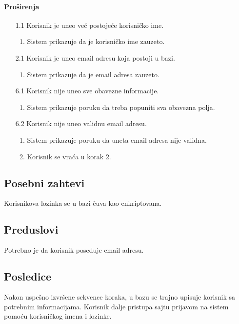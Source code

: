 \documentclass[a4paper,12pt]{report}
\begin{document}
    \paragraph*{Proširenja} 
    \begin{enumerate}
        \item[1.1] Korisnik je uneo već postojeće korisničko ime.
            \begin{enumerate}[noitemsep,topsep=-8pt]
                \item Sistem prikazuje da je korisničko ime zauzeto.
            \end{enumerate}
   
        \item[2.1] Korisnik je uneo email adresu koja postoji u bazi.
        \begin{enumerate}[noitemsep,topsep=-8pt]
            \item Sistem prikazuje da je email adresa zauzeto.
        \end{enumerate}
    
        \item[6.1] Korisnik nije uneo sve obavezne informacije.
            \begin{enumerate}[noitemsep,topsep=-8pt]
                \item Sistem prikazuje poruku da treba popuniti sva obavezna polja.
            \end{enumerate}
 
        \item[6.2] Korisnik nije uneo validnu email adresu.
             \begin{enumerate}[noitemsep,topsep=-8pt]
                \item Sistem prikazuje poruku da uneta email adresa nije validna.
                \item Korisnik se vraća u korak 2.
            \end{enumerate}
    \end{enumerate}
    
\subsection{Posebni zahtevi}
    Korisnikova lozinka se u bazi čuva kao enkriptovana.
\subsection{Preduslovi}
    Potrebno je da korisnik poseduje email adresu. 
\subsection{Posledice}
    Nakon uspešno izvršene sekvence koraka, u bazu se trajno upisuje korisnik sa potrebnim informacijama. Korisnik dalje pristupa sajtu prijavom na sistem pomoću korisničkog imena i lozinke.
\end{document}

